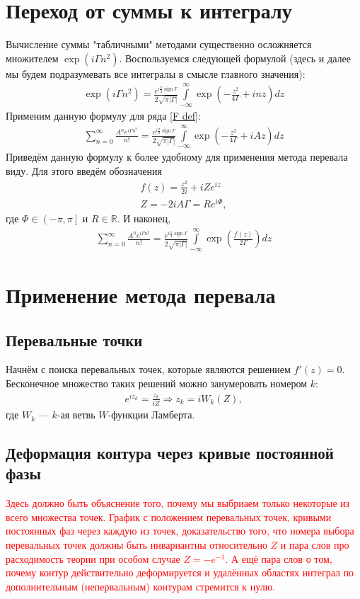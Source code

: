 \documentclass[a4paper, 12pt]{article}
\DeclareMathOperator*{\sign}{sign}
\newenvironment{eqw}{\begin{equation} \begin{aligned}}   
    {\end{aligned}    \end{equation}}
\begin{document}
\section*{Переход от суммы к интегралу}
Вычисление суммы "табличными" методами существенно осложняется множителем $\exp\left(i\Gamma n^2\right)$. Воспользуемся следующей формулой (здесь и далее мы будем подразумевать все интегралы в смысле главного значения):
\begin{eqw}
    \exp\left(i\Gamma n^2\right) = \frac{e^{i\frac{\pi}{4}\sign \Gamma}}{2\sqrt{\pi|\Gamma|}}
    \int\limits_{-\infty}^{\infty} \exp\left(-\frac{z^2}{4\Gamma} + i n z\right) dz
\end{eqw}
Применим данную формулу для ряда \eqref{F def}:
\begin{eqw}
    \sum\limits_{n=0}^{\infty} \frac{A^n e^{i\Gamma n^2}}{n!} = \frac{e^{i\frac{\pi}{4}\sign \Gamma}}{2\sqrt{\pi|\Gamma|}}
    \int\limits_{-\infty}^{\infty} \exp\left(-\frac{z^2}{4\Gamma} + i A z\right) dz
\end{eqw}
Приведём данную формулу к более удобному для применения метода перевала виду. Для этого введём обозначения
\begin{eqw}
    f(z) =  \frac{z^2}{2i} + i Z e^{iz}\\
    Z = -2i A \Gamma = R e^{i\Phi},
\end{eqw}
где $\Phi\in\left(-\pi, \pi\right]$ и $R\in\mathbb{R}$. И наконец, 
\begin{eqw}\label{row to integral}
    \sum\limits_{n=0}^{\infty} \frac{A^n e^{i\Gamma n^2}}{n!} = \frac{e^{i\frac{\pi}{4}\sign \Gamma}}{2\sqrt{\pi|\Gamma|}}
    \int\limits_{-\infty}^{\infty}\exp\left(\frac{f(z)}{2\Gamma}\right)dz 
\end{eqw}

\section*{Применение метода перевала}
\subsection*{Перевальные точки}
Начнём с поиска перевальных точек, которые являются решением $f'(z)=0$. Бесконечное множество таких решений можно занумеровать номером $k$:
\begin{eqw}
    e^{i z_k} = \frac{z_k}{iZ} \Rightarrow   z_k = i W_k(Z),
\end{eqw}
где $W_k$ --- $k$-ая ветвь $W$-функции Ламберта. 
\subsection*{Деформация контура через кривые постоянной фазы}
\textcolor{red}{Здесь должно быть объяснение того, почему мы выбриаем только некоторые из всего множества точек. График с положением перевальных точек, кривыми постоянных фаз через каждую из точек, доказательство того, что номера выбора перевальных точек должны быть инвариантны относительно $Z$ и пара слов про расходимость теории при особом случае $Z=-e^{-1}$. А ещё пара слов о том, почему контур действительно деформируется и удалённых областях интеграл по дополнительным (непервальным) контурам стремится к нулю.}
\end{document}
